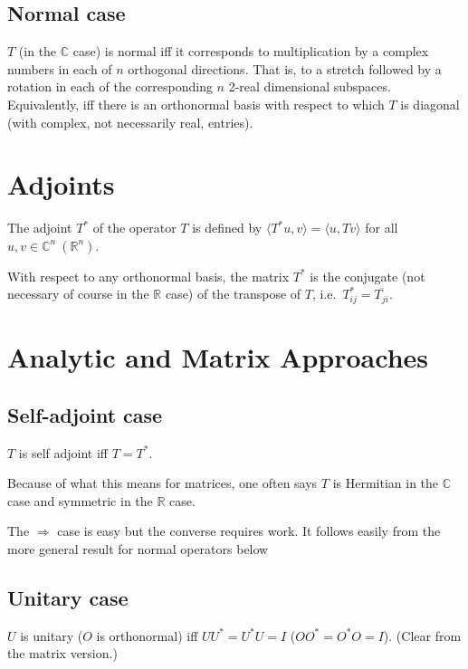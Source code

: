 \documentclass[a4paper]{amsart}
\theoremstyle{plain}
\theoremstyle{definition}
\theoremstyle{remark}
\begin{document}
\subsection{Normal case}
$ T $  (in the $ \mathbb{C} $  case) is normal iff it corresponds to multiplication by a  complex numbers in each of $ n $  orthogonal directions. That 
is, to a stretch followed by a rotation in each of the corresponding $ n $  2-real dimensional subspaces. 
Equivalently, iff  there is an orthonormal basis with respect to which $ T $  is 
diagonal (with complex, not necessarily real, entries). 

\section{\textbf{Adjoints}}
The adjoint $ T^* $  of the operator $  T $ is defined by $ \langle T^* u,v \rangle  = \langle u, T v\rangle $  
for all $ u, v \in \mathbb{C} ^n\  (\mathbb{R}^n )$.

With respect to any orthonormal basis, the matrix $ T^* $ is the conjugate (not 
necessary of course in the $ \mathbb{R} $  case) of the transpose of $ T $, i.e.\  $ T^*_{ij} = \overline{T_{ji}}$.
 

\section{\textbf{Analytic and Matrix Approaches}}

\subsection{Self-adjoint case}
$ T$  is self adjoint iff $ T = T^* $. 

Because of what this means for matrices, one often says $ T$  is Hermitian 
in the $ \mathbb{C}$   case and symmetric in the $ \mathbb{R} $  case. 

The  $ \Longrightarrow $ case is easy but the converse requires work. It follows easily from 
the more general result for normal operators below 


\subsection{Unitary case} $ U $ is unitary ($ O $ is orthonormal) iff $ U U^*  = U^* U = I$  ($ OO^* = O^*O = I $). 
(Clear from the matrix version.) 
\end{document}
